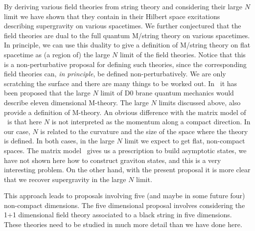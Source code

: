 By
deriving various field theories from string 
theory 
 and considering their large $N$ limit we have shown that 
they   contain in their Hilbert space excitations
describing supergravity on various spacetimes. 
We further conjectured that  the field  theories  are dual to the full quantum
M/string theory on   various spacetimes. 
In principle, we can use  this duality to give a  definition
of M/string theory on flat spacetime as (a region of)  the large $N$ limit of the
field theories. 
Notice that this is a non-perturbative proposal  for defining such 
theories, since the corresponding field theories can, {\it in principle}, 
be defined non-perturbatively. We are only scratching the surface and
there are many things to be worked out.
In \bfss\ it has been proposed that the large $N$ limit of 
D0 brane quantum mechanics would describe eleven dimensional M-theory.
%
The large $N$ limits discussed above, also provide  a definition 
of M-theory. An obvious  difference with the matrix model of \bfss\ is 
that here $N$ is not interpreted as  the momentum along a compact 
 direction. In our 
 case,  $N$ is related to the curvature and the size 
of the space where the theory is defined. In both cases, in the large 
$N$ limit we expect to  get flat, non-compact spaces. 
The  matrix model \bfss\ gives us a prescription 
 to build asymptotic states,
we have not shown here how to construct 
graviton states, and this is a very interesting problem. 
On the other hand, with the present proposal it is more clear 
 that 
we recover supergravity in the large $N$ limit. 

This approach leads to proposals involving five (and
maybe in some future four)
 non-compact
dimensions. The five dimensional proposal involves considering 
the 1+1 dimensional field theory associated to a black string 
in five dimensions.
These theories need to be studied in 
much more detail than we have done here. 


